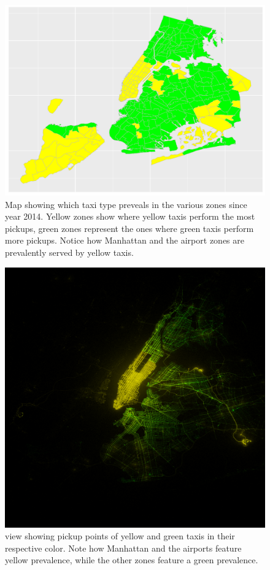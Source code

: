 \documentclass{acm_proc_article-sp-sigmod09}
\begin{document}
\begin{figure}
	\centering
	\includegraphics[width=1\columnwidth]{resources/base_plots/pickup_location_by_company_after_2014_distr_difference_map.pdf}
	\caption{Map showing which taxi type preveals in the various zones since year 2014. Yellow zones show where yellow taxis perform the most pickups, green zones represent the ones where green taxis perform more pickups. Notice how Manhattan and the airport zones are prevalently served by yellow taxis.}
	\label{fig:companyDivisionMap}
\end{figure}
\begin{figure}
	\centering
	\includegraphics[width=1\columnwidth]{resources/base_plots/yellow_vs_green_pickup.png}
	\caption{ view showing pickup points of yellow and green taxis in their respective color. Note how Manhattan and the airports feature yellow prevalence, while the other zones feature a green prevalence.}
	\label{fig:companyDivisionImageMap}
\end{figure}
\end{document}
